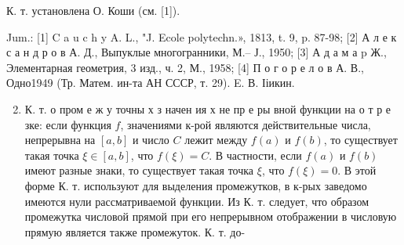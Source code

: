 \documentclass[10pt]{article}
\begin{document}
К. т. установлена О. Коши (см. [1]).



Jum.: [1] C a u c h y A. L., "J. Ecole polytechn.», 1813, t. 9, p. 87-98; [2] А л е к с а н д р о в А. Д., Выпуклые многогранники, М.-- Ј., 1950; [3] А д а м а p Ж., Элементарная геометрия, 3 изд., ч. 2, М., 1958; [4] П о г о р е л о в А. В., Одно1949 (Тр. Матем. ин-та АН СССР, т. 29). E. В. Ііикин.



\begin{enumerate}

  \setcounter{enumi}{1}

  \item К. т. о пром е ж у точны х з начен ия х не пр е ры вной функции на о т р е зке: если функция $f$, значениями к-рой являются действительные числа, непрерывна на $[a, b]$ и число $C$ лежит между $f(a)$ и $f(b)$, то существует такая точка $\xi \in[a, b]$, что $f(\xi)=C$. В частности, если $f(a)$ и $f(b)$ имеют разные знаки, то существует такая точка $\xi$, что $f(\xi)=0$. В этой форме К. т. используют для выделения промежутков, в к-рых заведомо имеются нули рассматриваемой функции. Из К. т. следует, что образом промежутка числовой прямой при его непрерывном отображении в числовую прямую является также промежуток. К. т. до-

\end{enumerate}
\end{document}
